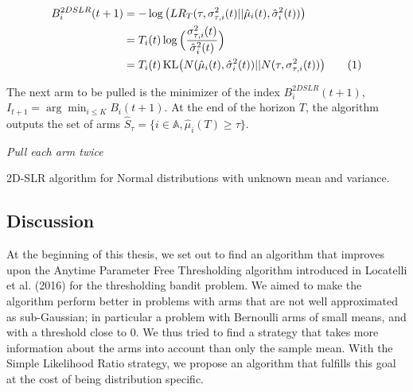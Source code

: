 \documentclass[11pt,]{article}
\newcommand{\KL}{\,\text{KL}}
\newcommand*{\Alignyesnumber}{\refstepcounter{equation}\tag{\theequation}}%
\begin{document}
\begin{align*}
B_i^{2DSLR}(t+1) & = -\log\big(LR_T(\tau, \sigma_{\tau,i}^2(t)||\hat{\mu}_i(t),\hat{\sigma}^2_{i}(t))\big) \\
& = T_i(t) \log\Big(\frac{\sigma_{\tau,i}^2(t)}{\hat{\sigma}_i^2(t)}\Big) \\
& = T_i(t) \KL\big(N(\hat{\mu}_i(t),\hat{\sigma}^2_{i}(t))||N(\tau, \sigma_{\tau,i}^2(t))\big) \Alignyesnumber\label{eqn:SLR2DIndex}
\end{align*}

The next arm to be pulled is the minimizer of the index
\(B_i^{2DSLR}(t+1)\), \(I_{t+1} = \arg \min_{i \leq K} B_i(t+1)\). At
the end of the horizon \(T\), the algorithm outputs the set of arms
\(\hat{S}_\tau = \{i \in \mathbb{A}, \hat{\mu}_i(T) \geq \tau\}\).

\IncMargin{1em}

\begin{algorithm}
\BlankLine
\emph{Pull each arm twice}\;
\caption{2D-SLR algorithm for Normal distributions with unknown mean and variance.}\label{algo_slr_2d}
\end{algorithm}

\DecMargin{1em}

\subsection{Discussion}\label{discussion-1}

At the beginning of this thesis, we set out to find an algorithm that
improves upon the Anytime Parameter Free Thresholding algorithm
introduced in Locatelli et al. (2016) for the thresholding bandit
problem. We aimed to make the algorithm perform better in problems with
arms that are not well approximated as sub-Gaussian; in particular a
problem with Bernoulli arms of small means, and with a threshold close
to 0. We thus tried to find a strategy that takes more information about
the arms into account than only the sample mean. With the Simple
Likelihood Ratio strategy, we propose an algorithm that fulfills this
goal at the cost of being distribution specific.
\end{document}
